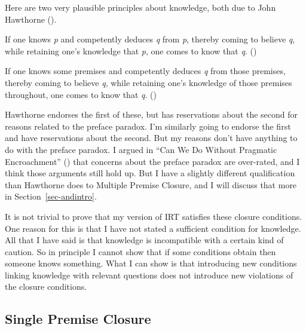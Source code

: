 \documentclass[
  10pt,
  letterpaper,
  twoside]{scrbook}
\providecommand{\tightlist}{%
  \setlength{\itemsep}{0pt}\setlength{\parskip}{0pt}}\usepackage{longtable,booktabs,array}
\begin{document}
Here are two very plausible principles about knowledge, both due to John
Hawthorne ().

\begin{description}
\tightlist
\item[Single Premise Closure]
If one knows \emph{p} and competently deduces \emph{q} from \emph{p},
thereby coming to believe \emph{q}, while retaining one's knowledge that
\emph{p}, one comes to know that \emph{q}.
()
\item[Multiple Premise Closure]
If one knows some premises and competently deduces \emph{q} from those
premises, thereby coming to believe \emph{q}, while retaining one's
knowledge of those premises throughout, one comes to know that \emph{q}.
()
\end{description}

Hawthorne endorses the first of these, but has reservations about the
second for reasons related to the preface paradox. I'm similarly going
to endorse the first and have reservations about the second. But my
reasons don't have anything to do with the preface paradox. I argued in
``Can We Do Without Pragmatic Encroachment''
() that concerns
about the preface paradox are over-rated, and I think those arguments
still hold up. But I have a slightly different qualification than
Hawthorne does to Multiple Premise Closure, and I will discuss that more
in Section~\ref{sec-andintro}.

It is not trivial to prove that my version of IRT satisfies these
closure conditions. One reason for this is that I have not stated a
sufficient condition for knowledge. All that I have said is that
knowledge is incompatible with a certain kind of caution. So in
principle I cannot show that if some conditions obtain then someone
knows something. What I can show is that introducing new conditions
linking knowledge with relevant questions does not introduce new
violations of the closure conditions.

\subsection{Single Premise Closure}\label{sec-andelim}
\end{document}
